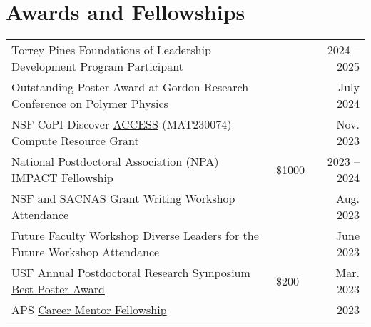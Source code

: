 \documentclass[letterpaper,11pt]{article}
\begin{document}
\section*{Awards and Fellowships}
\vspace{-0.8\baselineskip}
\begin{longtable}{@{}p{} p{} r@{}}
  Torrey Pines Foundations of Leadership Development Program Participant                                                                                                                                                              &         & 2024 -- 2025 \\[3pt]
  Outstanding Poster Award at Gordon Research Conference on Polymer Physics                                                                                                                                                           &         & July 2024    \\[3pt]
  NSF CoPI Discover \href{https://access-ci.org/}{ACCESS} (MAT230074) Compute Resource Grant                                                                                                                                          &         & Nov. 2023    \\[3pt]
  National Postdoctoral Association (NPA) \href{https://www.nationalpostdoc.org/general/custom.asp?page=IMPACTProgram}{IMPACT Fellowship}                                                                                             & \$1000  & 2023 -- 2024 \\[3pt]
  NSF and SACNAS Grant Writing Workshop Attendance                                                                                                                                                                                    &         & Aug. 2023    \\[3pt]
  Future Faculty Workshop Diverse Leaders for the Future Workshop Attendance                                                                                                                                                          &         & June 2023    \\[3pt]
  USF Annual Postdoctoral Research Symposium \href{https://www.usf.edu/postdoctoral-affairs/postdoc-services/postdoc-spotlight.aspx#:~:text=BEST\%20POSTERS\%3A-,Pierre\%20Kawak,-Exploring\%20Mechanisms\%20of}{Best Poster Award}   & \$200   & Mar. 2023    \\[3pt]
  APS \href{https://www.aps.org/careers/guidance/mentoring.cfm}{Career Mentor Fellowship}                                                                                                                                             &         & 2023         \\[3pt]

\end{longtable}
\end{document}
